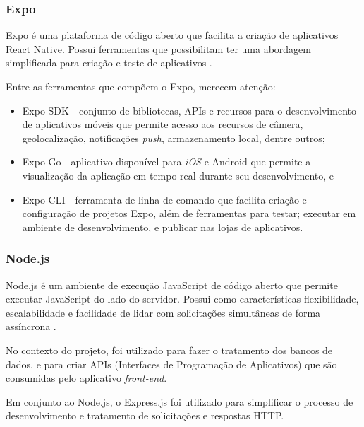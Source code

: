 \subsubsection{Expo}
\label{sec:Expo}
Expo é uma plataforma de código aberto que facilita a criação de aplicativos React Native. Possui ferramentas que  
possibilitam ter uma abordagem simplificada para criação e teste de aplicativos \cite{expo}.

\begin{description}
    \item Entre as ferramentas que compõem o Expo, merecem atenção:
          \begin{itemize}
              \item Expo SDK - conjunto de bibliotecas, APIs e recursos para o desenvolvimento de aplicativos móveis que permite acesso aos 
              recursos de câmera, geolocalização, notificações \textit{push}, armazenamento local, dentre outros;

              \item Expo Go - aplicativo disponível para \textit{iOS} e Android que permite a visualização da aplicação em tempo real durante seu 
              desenvolvimento, e

              \item Expo CLI - ferramenta de linha de comando que facilita criação e configuração de projetos Expo, além de ferramentas para 
              testar; executar em ambiente de desenvolvimento, e publicar nas lojas de aplicativos.
          \end{itemize}
\end{description}

\subsubsection{Node.js}
\label{sec:Node.js}
Node.js é um ambiente de execução JavaScript de código aberto que permite executar JavaScript do lado do servidor. Possui como características 
flexibilidade, escalabilidade e facilidade de lidar com solicitações simultâneas de forma assíncrona \cite{nodejs}.

No contexto do projeto, foi utilizado para fazer o tratamento dos bancos de dados, e para criar 
APIs (Interfaces de Programação de Aplicativos) que são consumidas pelo aplicativo \textit{front-end}.

Em conjunto ao Node.js, o Express.js foi utilizado para simplificar o processo de desenvolvimento e tratamento de solicitações e respostas HTTP.

